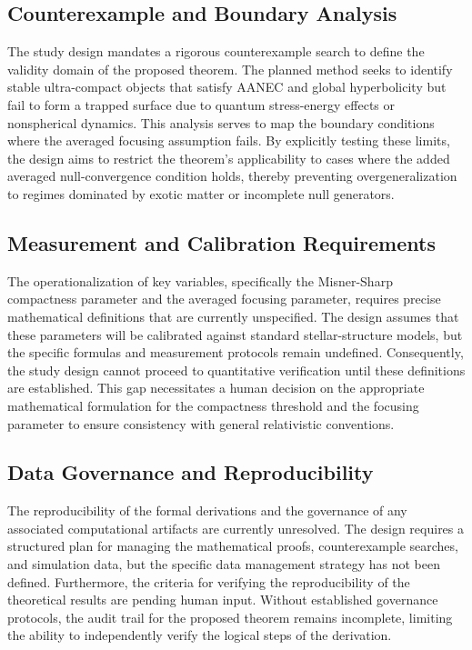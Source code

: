 \documentclass[conference]{IEEEtran}
\begin{document}
\subsection{Counterexample and Boundary Analysis}
The study design mandates a rigorous counterexample search to define the validity domain of the proposed theorem. The planned method seeks to identify stable ultra-compact objects that satisfy AANEC and global hyperbolicity but fail to form a trapped surface due to quantum stress-energy effects or nonspherical dynamics. This analysis serves to map the boundary conditions where the averaged focusing assumption fails. By explicitly testing these limits, the design aims to restrict the theorem's applicability to cases where the added averaged null-convergence condition holds, thereby preventing overgeneralization to regimes dominated by exotic matter or incomplete null generators.

\subsection{Measurement and Calibration Requirements}
The operationalization of key variables, specifically the Misner-Sharp compactness parameter and the averaged focusing parameter, requires precise mathematical definitions that are currently unspecified. The design assumes that these parameters will be calibrated against standard stellar-structure models, but the specific formulas and measurement protocols remain undefined. Consequently, the study design cannot proceed to quantitative verification until these definitions are established. This gap necessitates a human decision on the appropriate mathematical formulation for the compactness threshold and the focusing parameter to ensure consistency with general relativistic conventions.

\subsection{Data Governance and Reproducibility}
The reproducibility of the formal derivations and the governance of any associated computational artifacts are currently unresolved. The design requires a structured plan for managing the mathematical proofs, counterexample searches, and simulation data, but the specific data management strategy has not been defined. Furthermore, the criteria for verifying the reproducibility of the theoretical results are pending human input. Without established governance protocols, the audit trail for the proposed theorem remains incomplete, limiting the ability to independently verify the logical steps of the derivation.
\end{document}
